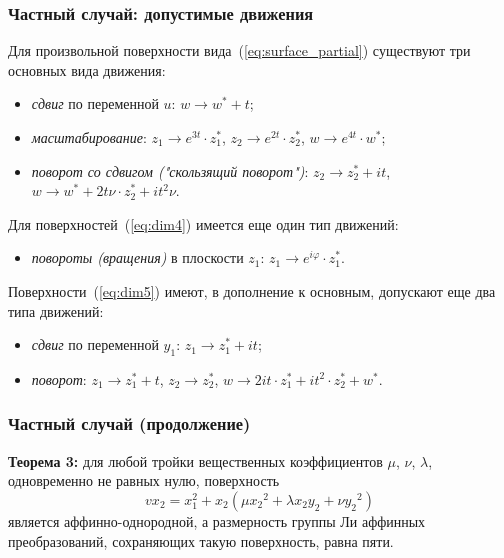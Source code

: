 \documentclass[russian,hyperref={unicode}]{beamer}
\begin{document}
{
	\frametitle{Частный случай: допустимые движения}
	Для произвольной поверхности вида~(\ref{eq:surface_partial}) существуют три основных вида движения:
	\begin{itemize}
		\item \emph{сдвиг} по переменной $u$: $w \to w^{\ast} + t$;
		\item \emph{масштабирование}: $z_1 \to e^{3t} \cdot z_1^{\ast}$, $z_2 \to e^{2t} \cdot z_2^{\ast}$, $w \to e^{4t} \cdot w^{\ast}$;
		\item \emph{поворот со сдвигом ("скользящий поворот")}: $z_2 \to z_2^{\ast} + i t$, $w \to w^{\ast} + 2 t \nu \cdot z_2^{\ast} + i t^2 \nu$.
	\end{itemize} 
	
	Для поверхностей~(\ref{eq:dim4}) имеется еще один тип движений:
	\begin{itemize}
		\item \emph{повороты (вращения)} в плоскости $z_1$: $z_1 \to e^{i \varphi}  \cdot z_1^{\ast}$.
	\end{itemize}
	
	Поверхности~(\ref{eq:dim5}) имеют, в дополнение к основным, допускают еще два типа движений:
	\begin{itemize}
		\item \emph{сдвиг} по переменной $y_1$: $z_1 \to z_1^{\ast} + i t$; 
		\item \emph{поворот}: $z_1 \to z_1^{\ast} + t$, $z_2 \to z_2^{\ast}$, $w \to 2 i t \cdot z_1^{\ast} +  i t^2 \cdot z_2^{\ast} + w^{\ast}$.
	\end{itemize}
}
\frame
{
	\frametitle{Частный случай (продолжение)}
	\textbf{Теорема 3:}
	для любой тройки вещественных коэффициентов $\mu$, $\nu$, $\lambda$, 
	одновременно не равных нулю, поверхность
	\begin{equation*}
		v x_2 = x_1^2 + x_2 (\mu {x_2}^2 + \lambda x_2 y_2 + \nu {y_2}^2)	
	\end{equation*}
	является аффинно-однородной, а размерность группы Ли аффинных преобразований,   
    сохраняющих такую поверхность, равна пяти.
}
\end{document}
